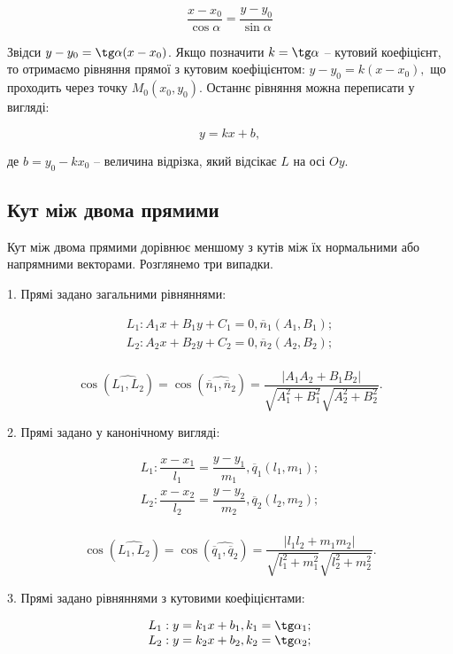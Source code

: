 $$\dfrac{x - x_0}{\cos\alpha} = \dfrac{y - y_0}{\sin\alpha}$$

Звідси $y - y_0 = \tg\alpha(x - x_0)$. Якщо позначити $k = \tg\alpha$ -- кутовий коефіцієнт,
то отримаємо рівняння прямої з кутовим коефіцієнтом:
$y - y_0 = k(x - x_0),$
що проходить через точку $M_0(x_0, y_0)$.
Останнє рівняння можна переписати у вигляді:

$$y = kx + b,$$

де $b = y_0 - kx_0$ -- величина відрізка, який відсікає $L$ на осі $Oy$. 

\subsection{Кут між двома прямими}

Кут між двома прямими дорівнює меншому з кутів між їх нормальними або
напрямними векторами. Розглянемо три випадки.

1. Прямі задано загальними рівняннями:

$$\begin{array}{l}
	L_1: A_1x + B_1y + C_1 = 0, \overline{n}_1(A_1,B_1); \\
	L_2: A_2x + B_2y + C_2 = 0, \overline{n}_2(A_2,B_2); \\
\end{array}$$

$$\cos(\widehat{L_1,L_2})
= \cos(\widehat{\overline{n}_1, \overline{n}_2})
= \dfrac{|A_1A_2 + B_1B_2|}{\sqrt{A_1^2+ B_1^2}\sqrt{A_2^2+ B_2^2}}.$$

2. Прямі задано у канонічному вигляді:

$$\begin{array}{l}
	L_1: \dfrac{x - x_1}{l_1} = \dfrac{y - y_1}{m_1}, \overline{q}_1(l_1,m_1); \\
	L_2: \dfrac{x - x_2}{l_2} = \dfrac{y - y_2}{m_2}, \overline{q}_2(l_2,m_2); \\
\end{array}$$

$$\cos(\widehat{L_1,L_2})
= \cos(\widehat{\overline{q}_1, \overline{q}_2})
= \dfrac{|l_1l_2 + m_1m_2|}{\sqrt{l_1^2+ m_1^2}\sqrt{l_2^2+ m_2^2}}.$$

3. Прямі задано рівняннями з кутовими коефіцієнтами: 

$$\begin{array}{l}
	L_1: y = k_1x + b_1, k_1 = \tg\alpha_1; \\
	L_2: y = k_2x + b_2, k_2 = \tg\alpha_2; \\
\end{array}$$


